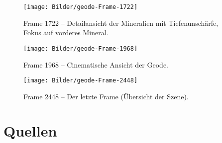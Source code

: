 \documentclass{scrreprt}
\begin{document}
\begin{figure}[!ht]
\centering
\texttt{[image: Bilder/geode-Frame-1722]}
\caption{Frame 1722 -- Detailansicht der Mineralien mit Tiefenunschärfe, Fokus auf vorderes Mineral.}
\label{frame1722-detail-DoF2}
\end{figure}

\begin{figure}[!ht]
\centering
\texttt{[image: Bilder/geode-Frame-1968]}
\caption{Frame 1968 -- Cinematische Ansicht der Geode.}
\label{frame1968-mineral}
\end{figure}

\begin{figure}[!ht]
\centering
\texttt{[image: Bilder/geode-Frame-2448]}
\caption{Frame 2448 -- Der letzte Frame (Übersicht der Szene).}
\label{frame2448-last}
\end{figure}

\chapter*{Quellen}
\renewcommand{\emph}[1]{\textit{#1}}
\printbibliography[heading=none]
\clearpage
\listoffigures
\end{document}
